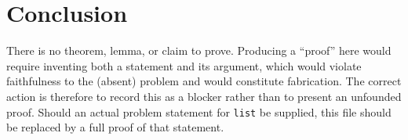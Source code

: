 \documentclass[12pt]{article}
\begin{document}
\section*{Conclusion}

There is no theorem, lemma, or claim to prove. Producing a ``proof'' here would
require inventing both a statement and its argument, which would violate
faithfulness to the (absent) problem and would constitute fabrication. The
correct action is therefore to record this as a blocker rather than to present
an unfounded proof. Should an actual problem statement for \texttt{list} be
supplied, this file should be replaced by a full proof of that statement.
\end{document}
